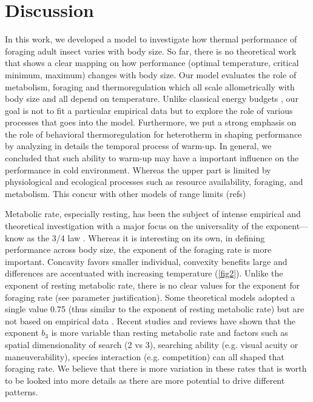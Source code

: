\section*{Discussion}
In this work, we developed a model to investigate how thermal performance of foraging adult insect varies with body size.
So far, there is no theoretical work that shows a clear mapping on how performance (optimal temperature, critical minimum, maximum) changes with body size. 
Our model evaluates the role of metabolism, foraging and thermoregulation which all scale allometrically with body size and all depend on temperature.
Unlike classical energy budgets \citep[e.g.,][]{Kooijman2009}, our goal is not to fit a particular empirical data but to explore the role of various processes that goes into the model.
Furthermore, we put a strong emphasis on the role of behavioral thermoregulation for heterotherm in shaping performance by analyzing in details the temporal process of warm-up.
In general, we concluded that such ability to warm-up may have a important influence on the performance in cold environment.
Whereas the upper part is limited by physiological and ecological processes such as resource availability, foraging, and metabolism.
This concur with other models of range limits (refs)%

Metabolic rate, especially resting, has been the subject of intense empirical and theoretical investigation with a major focus on  the universality of the exponent---know as the 3/4 law \citep{Peters1986,West1997, Kozlowski1997, Brown2004, Isaac2010}. 
Whereas it is interesting on its own, in defining performance across body size, the exponent of the foraging rate is more important.
Concavity favors smaller individual, convexity benefits large and differences are accentuated with increasing temperature (\cref{fig2}).
Unlike the exponent of resting metabolic rate, there is no clear values for the exponent for foraging rate (see parameter justification).
Some theoretical models adopted a single value 0.75 (thus similar to the exponent of resting metabolic rate) but are not based on empirical data \citep{Yodzis1992, Brown1993}.
Recent studies and reviews have shown that the exponent $b_3$  is more variable than resting metabolic rate and factors such as spatial dimensionality of search (2 vs 3), searching ability (e.g. visual acuity or maneuverability),  species interaction (e.g. competition) can all shaped that foraging rate\citep{Pawar2012, Kalinkat2015}.
We believe that there is more variation in these rates that is worth to be looked into more details as there are more potential to drive different patterns.

